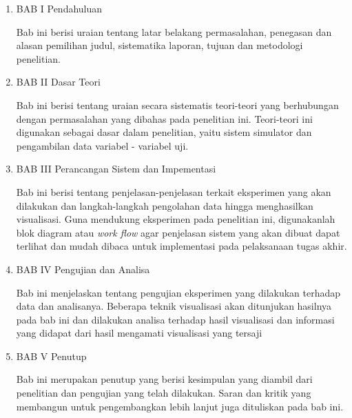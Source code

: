 \begin{enumerate}[nolistsep]
	\item BAB I Pendahuluan

	Bab ini berisi uraian tentang latar belakang permasalahan, penegasan dan alasan pemilihan judul, sistematika laporan, tujuan dan metodologi penelitian.
	\vspace{1ex}

	\item BAB II Dasar Teori

	Bab ini berisi tentang uraian secara sistematis teori-teori yang berhubungan dengan permasalahan yang dibahas pada penelitian ini. Teori-teori ini digunakan sebagai dasar dalam penelitian, yaitu sistem simulator dan pengambilan data variabel - variabel uji.
	\vspace{1ex}

	\item BAB III Perancangan Sistem dan Impementasi

	Bab ini berisi tentang penjelasan-penjelasan terkait eksperimen yang akan dilakukan dan langkah-langkah pengolahan data hingga menghasilkan visualisasi. Guna mendukung eksperimen pada penelitian ini, digunakanlah blok diagram atau \textit{work flow} agar penjelasan sistem yang akan dibuat dapat terlihat dan mudah dibaca untuk implementasi pada pelaksanaan tugas akhir.
	\vspace{1ex}

	\item BAB IV Pengujian dan Analisa

	Bab ini menjelaskan tentang pengujian eksperimen yang dilakukan terhadap data dan analisanya. Beberapa teknik visualisasi akan ditunjukan hasilnya pada bab ini dan dilakukan analisa terhadap hasil visualisasi dan informasi yang didapat dari hasil mengamati visualisasi yang tersaji
	\vspace{1ex}

	\item BAB V Penutup

	Bab ini merupakan penutup yang berisi kesimpulan yang diambil dari penelitian dan pengujian yang telah dilakukan. Saran dan kritik yang membangun untuk pengembangkan lebih lanjut juga dituliskan pada bab ini.
\end{enumerate}
\vspace{1ex}

